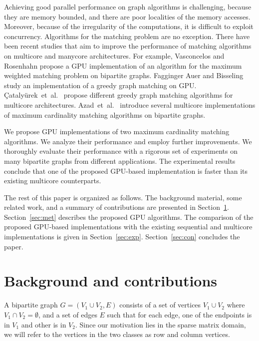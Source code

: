 \documentclass[11pt,a4paper]{article}
\begin{document}
Achieving good parallel performance on graph algorithms
is challenging, because they are memory bounded, and 
there are poor localities of the memory accesses. Moreover, because of 
the irregularity of the computations, it is difficult to exploit concurrency. 
Algorithms for the matching problem are no exception.
There have been recent studies that aim to improve the performance of 
matching algorithms on multicore and manycore architectures.
For example, Vasconcelos and Rosenhahn \cite{vasconcelos2009bipartite} propose
a GPU implementation of an algorithm for the maximum weighted matching problem on bipartite graphs. 
Fagginger Auer and Bisseling \cite{fagginger2012gpu} study 
an implementation of a greedy graph matching on GPU. 
\c{C}ataly\"{u}rek~et~al.~\cite{catalyurek2012multithreaded} propose
different greedy graph matching algorithms for multicore architectures. 
Azad~et~al.~\cite{ahrbka:12} 
introduce several multicore implementations of maximum cardinality matching 
algorithms on bipartite graphs. 

We propose GPU implementations of two maximum
cardinality matching algorithms. We analyze their
performance and employ further improvements. We thoroughly evaluate
their performance with a rigorous set of experiments on many bipartite
graphs from different applications. The experimental results
conclude that one of the proposed GPU-based implementation is faster than its
existing multicore counterparts.
 
The rest of this paper is organized as follows. The background
material, some related work, and a summary of contributions are presented in
Section~\ref{sec:back}. Section~\ref{sec:met} describes the proposed
GPU algorithms. The comparison of the proposed GPU-based
implementations with the existing sequential and multicore implementations
is given in
Section~\ref{sec:exp}. Section~\ref{sec:con} concludes the paper.

\vspace*{-1ex}
\section{Background and contributions}\label{sec:back}
\vspace*{-1ex}
A bipartite graph $G=(V_1\cup V_2,E)$ consists of a set of vertices $V_1\cup V_2$ where $V_1\cap V_2=\emptyset$, 
and a set of edges $E$ such that 
for each edge, one of the endpoints is in $V_1$ and other is in $V_2$.
Since our motivation lies in the sparse matrix domain, we will refer to the vertices in the two classes as row and column vertices.
\end{document}
